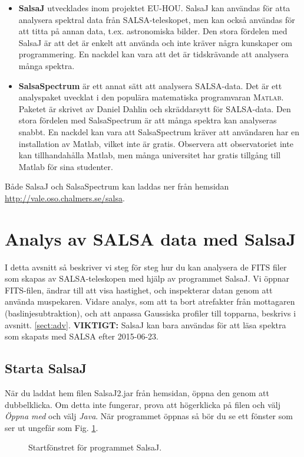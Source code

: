 \documentclass[11pt,swedish,a4paper]{article}
\begin{document}
\begin{itemize}
\item \textbf{SalsaJ} utvecklades inom projektet EU-HOU. SalsaJ
	kan användas för atta analysera spektral data från SALSA-teleskopet,
	men kan också användas för att titta på annan data, t.ex. astronomiska
	bilder. Den stora fördelen med SalsaJ är att det är enkelt
	att använda och inte kräver några kunskaper om programmering. 
	En nackdel kan vara att det är tidskrävande att analysera många spektra.
\item \textbf{SalsaSpectrum} är ett annat sätt att analysera SALSA-data. 
	Det är ett analyspaket uvecklat i den populära matematiska programvaran
   \textsc{\textsc{Matlab}}. Paketet är skrivet av Daniel Dahlin och 
   skräddarsytt för SALSA-data. Den stora fördelen med SalsaSpectrum är
   att många spektra kan analyseras snabbt. En nackdel kan vara att
   SalsaSpectrum kräver att användaren har en installation av Matlab, vilket
   inte är gratis. Observera att observatoriet inte kan tillhandahålla Matlab,
   men många universitet har gratis tillgång till Matlab för sina studenter.
\end{itemize}
Både SalsaJ och SalsaSpectrum kan laddas ner från hemsidan
{\url{http://vale.oso.chalmers.se/salsa}}. 

\section{Analys av SALSA data med SalsaJ}
\label{sec:salsaj}
I detta avsnitt så beskriver vi steg för steg hur du kan analysera de FITS
filer som skapas av SALSA-teleskopen med hjälp av programmet SalsaJ. Vi
öppnar FITS-filen, ändrar till att visa hastighet, och inspekterar datan
genom att använda muspekaren. Vidare analys, som att ta bort atrefakter
från mottagaren (baslinjesubtraktion), och att anpassa Gaussiska profiler
till topparna, beskrivs i avsnitt. \ref{sect:adv}.
\textbf{VIKTIGT:} SalsaJ kan bara användas för att läsa spektra som skapats 
med SALSA efter 2015-06-23.

\subsection{Starta SalsaJ}
När du laddat hem filen SalsaJ2.jar från hemsidan, öppna den genom att
dubbelklicka. Om detta inte fungerar, prova att högerklicka på filen och välj
\emph{Öppna med} och välj \emph{Java}. När programmet öppnas så bör du se ett
fönster som ser ut ungefär som Fig. \ref{fig:salsajstart}.
\begin{figure}[h!]
  \centering
  \caption{Startfönstret för programmet SalsaJ.}
  \label{fig:salsajstart}
\end{figure}
\end{document}
